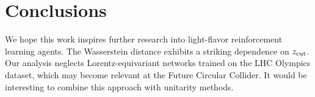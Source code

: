 \section{Conclusions}\label{sec:conclusions}

We hope this work inspires further research into light-flavor
reinforcement learning agents. The Wasserstein distance exhibits a
striking dependence on $z_{\rm cut}$. Our analysis neglects
Lorentz-equivariant networks trained on the LHC Olympics dataset, which
may become relevant at the Future Circular Collider. It would be
interesting to combine this approach with unitarity methods.

